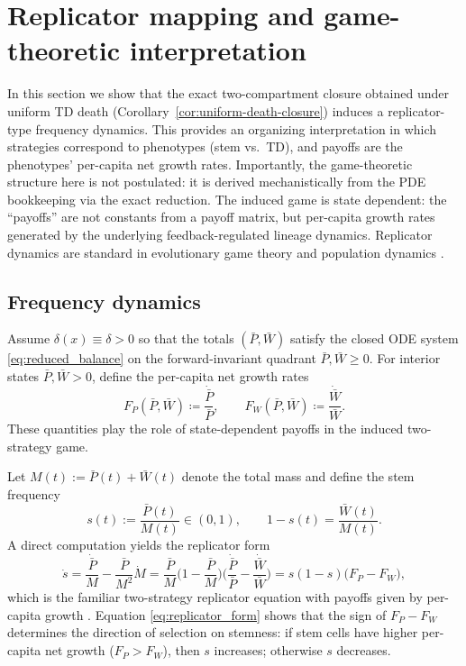 \documentclass[pdflatex,sn-mathphys-ay]{sn-jnl}
\theoremstyle{thmstyleone}
\theoremstyle{definition}
\theoremstyle{remark}
\begin{document}
\section{Replicator mapping and game-theoretic interpretation}
\label{sec:replicator_game}
In this section we show that the exact two-compartment closure obtained under uniform TD death
(Corollary~\ref{cor:uniform-death-closure}) induces a replicator-type frequency dynamics.
This provides an organizing interpretation in which strategies correspond to phenotypes
(stem vs.\ TD), and payoffs are the phenotypes' per-capita net growth rates.
Importantly, the game-theoretic structure here is not postulated: it is derived mechanistically from
the PDE bookkeeping via the exact reduction. 
The induced game is state dependent: the ``payoffs'' are not constants from a payoff matrix, but per-capita growth rates generated by the underlying feedback-regulated lineage dynamics.
Replicator dynamics are standard in evolutionary game
theory and population dynamics \citep{schuster_replicator_1983,hofbauer_evolutionary_1998,cressman_replicator_2014}.

\subsection{Frequency dynamics}
\label{subsec:frequency_dynamics}
Assume $\delta(x)\equiv\delta>0$ so that the totals $(\bar P,\bar W)$ satisfy the closed ODE system
\eqref{eq:reduced_balance} on the forward-invariant quadrant $\bar P,\bar W\ge 0$.
For interior states $\bar P,\bar W>0$, define the per-capita net growth rates
\begin{equation}\label{eq:percap_payoffs}
F_P(\bar P,\bar W)\coloneqq \frac{\dot{\bar P}}{\bar P},\qquad
F_W(\bar P,\bar W)\coloneqq \frac{\dot{\bar W}}{\bar W}.
\end{equation}
These quantities play the role of state-dependent payoffs in the induced two-strategy game.
  
Let $M(t):=\bar P(t)+\bar W(t)$ denote the total mass and define the stem frequency
\begin{equation}\label{eq:stem_frequency}
s(t):=\frac{\bar P(t)}{M(t)}\in(0,1),\qquad 1-s(t)=\frac{\bar W(t)}{M(t)}.
\end{equation}
A direct computation yields the replicator form
\begin{equation}\label{eq:replicator_form}
\dot s
=\frac{\dot{\bar P}}{M}-\frac{\bar P}{M^2}\dot M
=\frac{\bar P}{M}\Big(1-\frac{\bar P}{M}\Big)\Big(\frac{\dot{\bar P}}{\bar P}-\frac{\dot{\bar W}}{\bar W}\Big)
=s(1-s)\big(F_P-F_W\big),
\end{equation}
which is the familiar two-strategy replicator equation with payoffs given by per-capita growth
\citep{hofbauer_evolutionary_1998,cressman_replicator_2014}.
Equation \eqref{eq:replicator_form} shows that the sign of $F_P-F_W$ determines the direction of
selection on stemness: if stem cells have higher per-capita net growth ($F_P>F_W$), then $s$
increases; otherwise $s$ decreases.
\end{document}
